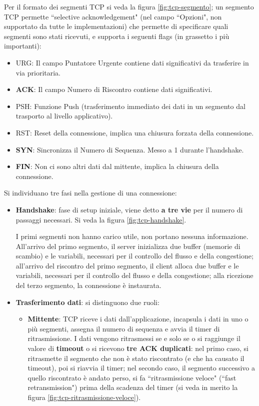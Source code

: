 \documentclass[11pt, italian, openany]{book}
\begin{document}
\begin{sloppypar}
\begin{itemize}[topsep=0pt, itemsep=0pt, parsep=0pt]
	Per il formato dei segmenti TCP si veda la figura \ref{fig:tcp-segmento}; un segmento TCP permette ``selective acknowledgement" (nel campo ``Opzioni",
	non supportato da tutte le implementazioni) che permette di specificare quali segmenti sono stati ricevuti, e supporta i seguenti flags (in grassetto i
	pi\`u importanti):
	\begin{itemize}[topsep=0pt, itemsep=0pt, parsep=0pt]
		\item URG: Il campo Puntatore Urgente contiene dati significativi da trasferire in via prioritaria.
		\item \textbf{ACK}: Il campo Numero di Riscontro contiene dati significativi.
		\item PSH: Funzione Push (trasferimento immediato dei dati in un segmento dal trasporto al livello applicativo).
		\item RST: Reset della connessione, implica una chiusura forzata della connessione.
		\item \textbf{SYN}: Sincronizza il Numero di Sequenza. Messo a 1 durante l'handshake.
		\item \textbf{FIN}: Non ci sono altri dati dal mittente, implica la chiusura della connessione.
	\end{itemize}

	Si individuano tre fasi nella gestione di una connessione:
	\begin{itemize}[topsep=0pt, itemsep=0pt, parsep=0pt]
		\item \textbf{Handshake}: fase di setup iniziale, viene detto \textbf{a tre vie} per il numero di passaggi necessari. Si veda la figura
		\ref{fig:tcp-handshake}.
		
		I primi segmenti non hanno carico utile, non portano nessuna informazione. All'arrivo del primo segmento, il server inizializza due buffer (memorie di
		scambio) e le variabili, necessari per il controllo del flusso e della congestione; all'arrivo del riscontro del primo segmento, il client alloca due
		buffer e le variabili, necessari per il controllo del flusso e della congestione; alla ricezione del terzo segmento, la connessione \`e instaurata.

		\item \textbf{Trasferimento dati}: si distinguono due ruoli:
		\begin{itemize}[topsep=0pt, itemsep=0pt, parsep=0pt]
			\item \textbf{Mittente}: TCP riceve i dati dall'applicazione, incapsula i dati in uno o pi\`u segmenti, assegna il numero di sequenza e
			avvia il timer di ritrasmissione. I dati vengono ritrasmessi se e solo se o si raggiunge il valore di \textbf{timeout} o si ricevono \textbf{tre
			ACK duplicati}: nel primo caso, si ritrasmette il segmento che non \`e stato riscontrato (e che ha causato il timeout), poi si riavvia il timer;
			nel secondo caso, il segmento successivo a quello riscontrato \`e andato perso, si fa ``ritrasmissione veloce" (``fast retransmission") prima della
			scadenza del timer (si veda in merito la figura \ref{fig:tcp-ritrasmissione-veloce}).


\end{itemize}
\end{itemize}
\end{itemize}
\end{sloppypar}
\end{document}
